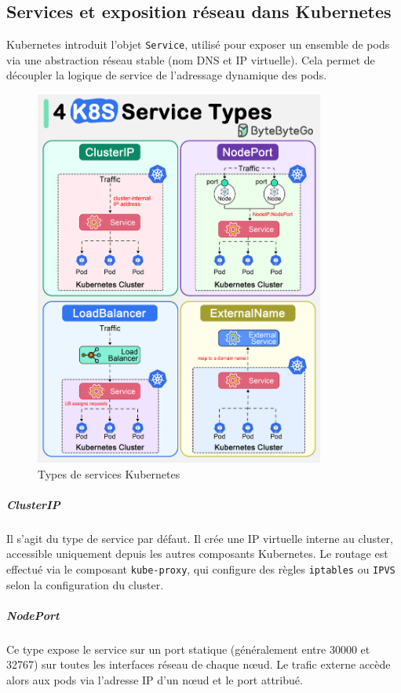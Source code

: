 \subsection{Services et exposition réseau dans Kubernetes}

Kubernetes introduit l’objet \texttt{Service}, utilisé pour exposer un ensemble de pods via une abstraction réseau stable (nom DNS et IP virtuelle). Cela permet de découpler la logique de service de l’adressage dynamique des pods.

\begin{figure}[H]
	\centering
	\includegraphics[width=0.85\textwidth]{figures/k8s-service-types.png}
	\caption{Types de services Kubernetes}
\end{figure}

\subparagraph{ClusterIP}
Il s’agit du type de service par défaut. Il crée une IP virtuelle interne au cluster, accessible uniquement depuis les autres composants Kubernetes. Le routage est effectué via le composant \texttt{kube-proxy}, qui configure des règles \texttt{iptables} ou \texttt{IPVS} selon la configuration du cluster.

\subparagraph{NodePort}
Ce type expose le service sur un port statique (généralement entre 30000 et 32767) sur toutes les interfaces réseau de chaque nœud. Le trafic externe accède alors aux pods via l’adresse IP d’un nœud et le port attribué.

